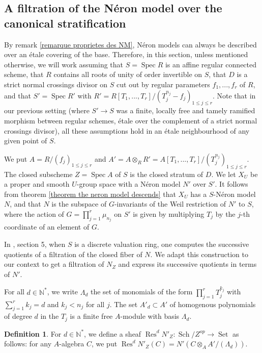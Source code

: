 \documentclass{article}
\newcommand{\N}{\mathbb{N}}
\DeclareMathOperator{\spec}{Spec}
\DeclareMathOperator{\sch}{Sch}
\DeclareMathOperator{\set}{Set}
\DeclareMathOperator{\rest}{Res}
\theoremstyle{definition}
\newtheorem{defi}[thm]{Definition}
\theoremstyle{remark}
\begin{document}
\subsection{A filtration of the N\'eron model over the canonical stratification}
By remark \ref{remarque proprietes des NM}, N\'eron models can always be described over an \'etale covering of the base. Therefore, in this section, unless mentioned otherwise, we will work assuming that $S=\spec R$ is an affine regular connected scheme, that $R$ contains all roots of unity of order invertible on $S$, that $D$ is a strict normal crossings divisor on $S$ cut out by regular parameters $f_1,...,f_r$ of $R$, and that $S'=\spec R'$ with $R'=R[T_1,...,T_r]/(T_j^{n_j}-f_j)_{1\leq j\leq r}$. Note that in our previous setting (where $S'\longrightarrow S$ was a finite, locally free and tamely ramified morphism between regular schemes, \'etale over the complement of a strict normal crossings divisor), all these assumptions hold in an \'etale neighbourhood of any given point of $S$.

We put $A=R/(f_j)_{1\leq j\leq r}$ and $A'=A\otimes_R R'=A[T_1,...,T_r]/(T_j^{n_j})_{1\leq j\leq r}$. The closed subscheme $Z=\spec A$ of $S$ is the closed stratum of $D$. We let $X_U$ be a proper and smooth $U$-group space with a N\'eron model $N'$ over $S'$. It follows from theorem \ref{theorem the neron model descends} that $X_U$ has a $S$-N\'eron model $N$, and that $N$ is the subspace of $G$-invariants of the Weil restriction of $N'$ to $S$, where the action of $G=\prod\limits_{j=1}^r \mu_{n_j}$ on $S'$ is given by multiplying $T_j$ by the $j$-th coordinate of an element of $G$.

In \cite{TameRamification}, section 5, when $S$ is a discrete valuation ring, one computes the successive quotients of a filtration of the closed fiber of $N$. We adapt this construction to our context to get a filtration of $N_Z$ and express its successive quotients in terms of $N'$.

For all $d\in\N^*$, we write $\Lambda_d$ the set of monomials of the form $\prod\limits_{j=1}^r T_j^{k_j}$ with $\sum\limits_{j=1}^r k_j=d$ and $k_j<n_j$ for all $j$. The set $A'_d\subset A'$ of homogenous polynomials of degree $d$ in the $T_j$ is a finite free $A$-module with basis $\Lambda_d$.

\begin{defi}\label{definition res^d}
For $d\in\N^*$, we define a sheaf $\rest^d N'_Z\colon\sch/Z^{op}\longrightarrow\set$ as follows: for any $A$-algebra $C$, we put $\rest^d N'_Z(C)=N'(C\otimes_A A'/(\Lambda_d))$.
\end{defi}
\end{document}
